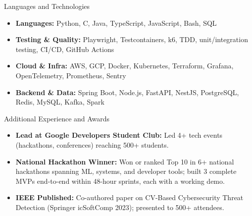 \documentclass[]{mcdowellcv}
\begin{document}
\begin{cvsection}{Languages and Technologies}
  \begin{cvsubsection}{}{}{}
    \begin{itemize}
      \item \textbf{Languages:} Python, C, Java, TypeScript, JavaScript, Bash, SQL
      \item \textbf{Testing \& Quality:} Playwright, Testcontainers, k6, TDD, unit/integration testing, CI/CD, GitHub Actions
      \item \textbf{Cloud \& Infra:} AWS, GCP, Docker, Kubernetes, Terraform, Grafana, OpenTelemetry, Prometheus, Sentry
      \item \textbf{Backend \& Data:} Spring Boot, Node.js, FastAPI, NestJS, PostgreSQL, Redis, MySQL, Kafka, Spark
    \end{itemize}
  \end{cvsubsection}
\end{cvsection}

\begin{cvsection}{Additional Experience and Awards}
  \begin{cvsubsection}{}{}{}
    \begin{itemize}
      \item \textbf{Lead at Google Developers Student Club:} Led 4+ tech events (hackathons, conferences) reaching 500+ students.
      \item \textbf{National Hackathon Winner:} Won or ranked Top 10 in 6+ national hackathons spanning ML, systems, and developer tools; built 3 complete MVPs end-to-end within 48-hour sprints, each with a working demo.
      \item \textbf{IEEE Published:} Co-authored paper on CV-Based Cybersecurity Threat Detection (Springer icSoftComp 2023); presented to 500+ attendees.
    \end{itemize}
  \end{cvsubsection}
\end{cvsection}
\end{document}
